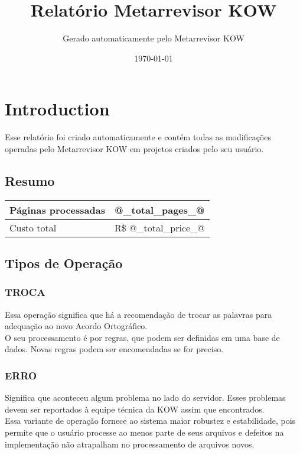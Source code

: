 \documentclass[portuguese,letterpaper]{book}
\newcommand\money[1]{R\$ #1}
\begin{document}
\title{Relatório Metarrevisor KOW}
\author{%
Gerado automaticamente pelo Metarrevisor KOW
}
\date{\today}
\maketitle

\tableofcontents{}

\chapter{Introduction}
Esse relatório foi criado automaticamente e contém todas as modificações operadas 
pelo Metarrevisor KOW em projetos criados pelo seu usuário.


\section{Resumo}
\begin{tabular}{|l@{ }c|}
	\hline
	Páginas processadas	& @_total_pages_@ \\
	\hline
	Custo total		& \money{@_total_price_@} \\
	\hline
\end{tabular}


\section{Tipos de Operação}

\subsection{TROCA}
	Essa operação significa que há a recomendação de trocar as palavras para
	adequação ao novo Acordo Ortográfico.\\

	O seu processamento é por regras, que podem ser definidas em uma base de
	dados. Novas regras podem ser encomendadas se for preciso.

\subsection{ERRO}
	Significa que aconteceu algum problema no lado do servidor. Esses problemas
	devem ser reportados à equipe técnica da KOW assim que encontrados.\\

	Essa variante de operação fornece ao sistema maior robustez e estabilidade,
	pois permite que o usuário processe ao menos parte de seus arquivos e
	defeitos na implementação não atrapalham no processamento de arquivos
	novos.\\
\end{document}
